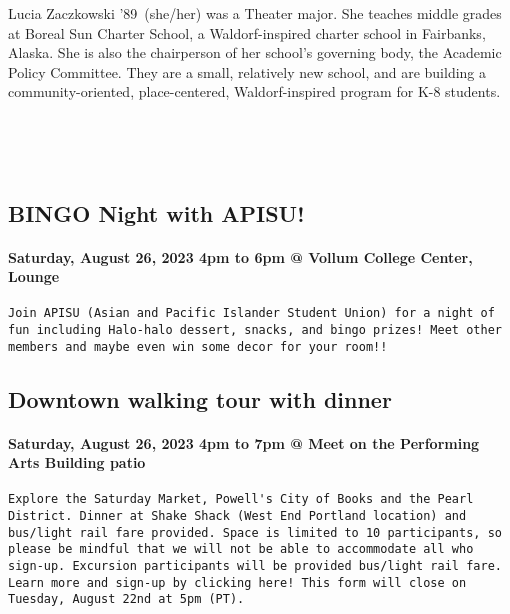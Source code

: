 \documentclass[
]{article}
\begin{document}
Lucia Zaczkowski '89~(she/her) was a Theater major. She teaches middle
grades at Boreal Sun Charter School, a Waldorf-inspired charter school
in Fairbanks, Alaska. She is also the chairperson of her school's
governing body, the Academic Policy Committee. They are a small,
relatively new school, and are building a community-oriented,
place-centered, Waldorf-inspired program for K-8 students.

~

~

\hypertarget{bingo-night-with-apisu}{%
\subsection{BINGO Night with APISU!}\label{bingo-night-with-apisu}}

\hypertarget{saturday-august-26-2023-4pm-to-6pm-vollum-college-center-lounge}{%
\paragraph{Saturday, August 26, 2023 4pm to 6pm @ Vollum College Center,
Lounge}\label{saturday-august-26-2023-4pm-to-6pm-vollum-college-center-lounge}}

\begin{verbatim}
Join APISU (Asian and Pacific Islander Student Union) for a night of fun including Halo-halo dessert, snacks, and bingo prizes! Meet other members and maybe even win some decor for your room!!
\end{verbatim}

\hypertarget{downtown-walking-tour-with-dinner}{%
\subsection{Downtown walking tour with
dinner}\label{downtown-walking-tour-with-dinner}}

\hypertarget{saturday-august-26-2023-4pm-to-7pm-meet-on-the-performing-arts-building-patio}{%
\paragraph{Saturday, August 26, 2023 4pm to 7pm @ Meet on the Performing
Arts Building
patio}\label{saturday-august-26-2023-4pm-to-7pm-meet-on-the-performing-arts-building-patio}}

\begin{verbatim}
Explore the Saturday Market, Powell's City of Books and the Pearl District. Dinner at Shake Shack (West End Portland location) and bus/light rail fare provided. Space is limited to 10 participants, so please be mindful that we will not be able to accommodate all who sign-up. Excursion participants will be provided bus/light rail fare. Learn more and sign-up by clicking here! This form will close on Tuesday, August 22nd at 5pm (PT).
\end{verbatim}
\end{document}
